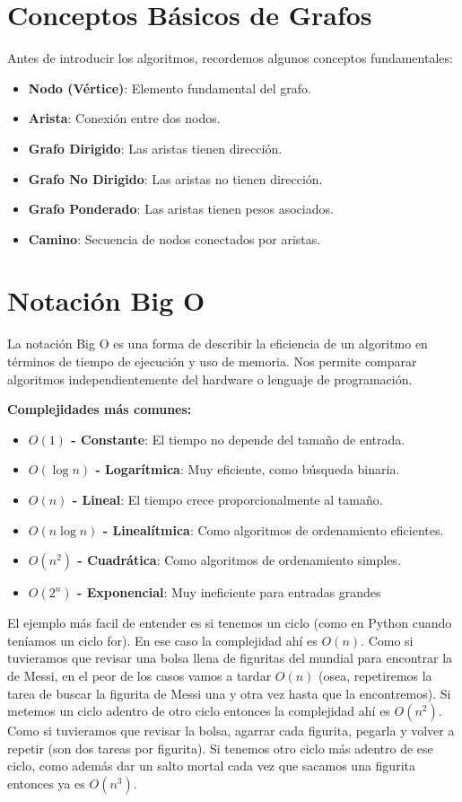 \documentclass[12pt]{article}
\begin{document}
\section{Conceptos Básicos de Grafos}
Antes de introducir los algoritmos, recordemos algunos conceptos fundamentales:

\begin{itemize}
    \item \textbf{Nodo (Vértice)}: Elemento fundamental del grafo.
    \item \textbf{Arista}: Conexión entre dos nodos.
    \item \textbf{Grafo Dirigido}: Las aristas tienen dirección.
    \item \textbf{Grafo No Dirigido}: Las aristas no tienen dirección.
    \item \textbf{Grafo Ponderado}: Las aristas tienen pesos asociados.
    \item \textbf{Camino}: Secuencia de nodos conectados por aristas.
\end{itemize}

\section{Notación Big O}
La notación Big O es una forma de describir la eficiencia de un algoritmo en términos de tiempo de ejecución y uso de memoria. Nos permite comparar algoritmos independientemente del hardware o lenguaje de programación.

\vspace{0.5em}

\textbf{Complejidades más comunes:}
\begin{itemize}
    \item \textbf{$O(1)$ - Constante}: El tiempo no depende del tamaño de entrada.
    \item \textbf{$O(\log n)$ - Logarítmica}: Muy eficiente, como búsqueda binaria.
    \item \textbf{$O(n)$ - Lineal}: El tiempo crece proporcionalmente al tamaño.
    \item \textbf{$O(n \log n)$ - Linealítmica}: Como algoritmos de ordenamiento eficientes.
    \item \textbf{$O(n^2)$ - Cuadrática}: Como algoritmos de ordenamiento simples.
    \item \textbf{$O(2^n)$ - Exponencial}: Muy ineficiente para entradas grandes
\end{itemize}

El ejemplo más facil de entender es si tenemos un ciclo (como en Python cuando teníamos un ciclo for). En ese caso la complejidad ahí es $O(n)$. Como si tuvieramos que revisar una bolsa llena de figuritas del mundial para encontrar la de Messi, en el peor de los casos vamos a tardar $O(n)$ (osea, repetiremos la tarea de buscar la figurita de Messi una y otra vez hasta que la encontremos). Si metemos un ciclo adentro de otro ciclo entonces la complejidad ahí es $O(n^2)$. Como si tuvieramos que revisar la bolsa, agarrar cada figurita, pegarla y volver a repetir (son dos tareas por figurita). Si tenemos otro ciclo más adentro de ese ciclo, como además dar un salto mortal cada vez que sacamos una figurita entonces ya es $O(n^3)$.
\end{document}
